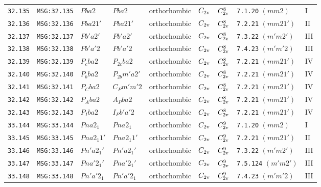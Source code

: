 \documentclass[fleqn,10pt]{jsarticle}
\begin{document}
\begin{center}
\begin{longtable}{lllllllll}
\texttt{32.135} & \texttt{MSG:32.135} & $Pba2$ & $Pba2$ & orthorhombic & $C_{\rm 2v}$ & $C_{\rm 2v}^{8}$ & \texttt{7.1.20} $(mm2)$ & I \\
\texttt{32.136} & \texttt{MSG:32.136} & $Pba21'$ & $Pba21'$ & orthorhombic & $C_{\rm 2v}$ & $C_{\rm 2v}^{8}$ & \texttt{7.2.21} $(mm21')$ & II \\
\texttt{32.137} & \texttt{MSG:32.137} & $Pb'a2'$ & $Pb'a2'$ & orthorhombic & $C_{\rm 2v}$ & $C_{\rm 2v}^{8}$ & \texttt{7.3.22} $(m'm2')$ & III \\
\texttt{32.138} & \texttt{MSG:32.138} & $Pb'a'2$ & $Pb'a'2$ & orthorhombic & $C_{\rm 2v}$ & $C_{\rm 2v}^{8}$ & \texttt{7.4.23} $(m'm'2)$ & III \\
\texttt{32.139} & \texttt{MSG:32.139} & $P_{c}ba2$ & $P_{2c}ba2$ & orthorhombic & $C_{\rm 2v}$ & $C_{\rm 2v}^{8}$ & \texttt{7.2.21} $(mm21')$ & IV \\
\texttt{32.140} & \texttt{MSG:32.140} & $P_{b}ba2$ & $P_{2b}m'a2'$ & orthorhombic & $C_{\rm 2v}$ & $C_{\rm 2v}^{8}$ & \texttt{7.2.21} $(mm21')$ & IV \\
\texttt{32.141} & \texttt{MSG:32.141} & $P_{C}ba2$ & $C_{P}m'm'2$ & orthorhombic & $C_{\rm 2v}$ & $C_{\rm 2v}^{8}$ & \texttt{7.2.21} $(mm21')$ & IV \\
\texttt{32.142} & \texttt{MSG:32.142} & $P_{A}ba2$ & $A_{P}ba2$ & orthorhombic & $C_{\rm 2v}$ & $C_{\rm 2v}^{8}$ & \texttt{7.2.21} $(mm21')$ & IV \\
\texttt{32.143} & \texttt{MSG:32.143} & $P_{I}ba2$ & $I_{P}b'a'2$ & orthorhombic & $C_{\rm 2v}$ & $C_{\rm 2v}^{8}$ & \texttt{7.2.21} $(mm21')$ & IV \\ \hline
\texttt{33.144} & \texttt{MSG:33.144} & $Pna2_{1}$ & $Pna2_{1}$ & orthorhombic & $C_{\rm 2v}$ & $C_{\rm 2v}^{9}$ & \texttt{7.1.20} $(mm2)$ & I \\
\texttt{33.145} & \texttt{MSG:33.145} & $Pna2_{1}1'$ & $Pna2_{1}1'$ & orthorhombic & $C_{\rm 2v}$ & $C_{\rm 2v}^{9}$ & \texttt{7.2.21} $(mm21')$ & II \\
\texttt{33.146} & \texttt{MSG:33.146} & $Pn'a2_{1}'$ & $Pn'a2_{1}'$ & orthorhombic & $C_{\rm 2v}$ & $C_{\rm 2v}^{9}$ & \texttt{7.3.22} $(m'm2')$ & III \\
\texttt{33.147} & \texttt{MSG:33.147} & $Pna'2_{1}'$ & $Pna'2_{1}'$ & orthorhombic & $C_{\rm 2v}$ & $C_{\rm 2v}^{9}$ & \texttt{7.5.124} $(m'm2')$ & III \\
\texttt{33.148} & \texttt{MSG:33.148} & $Pn'a'2_{1}$ & $Pn'a'2_{1}$ & orthorhombic & $C_{\rm 2v}$ & $C_{\rm 2v}^{9}$ & \texttt{7.4.23} $(m'm'2)$ & III \\

\end{longtable}
\end{center}
\end{document}

